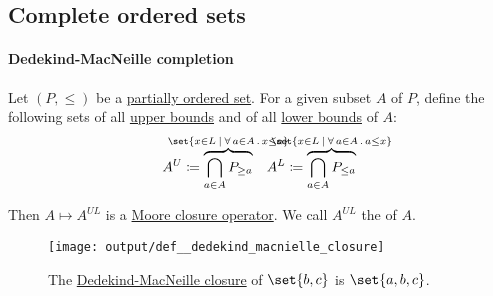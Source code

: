 \subsection{Complete ordered sets}\label{subsec:complete_ordered_set}

\paragraph{Dedekind-MacNeille completion}

\begin{definition}\label{def:dedekind_macnielle_closure}\mimprovised
  Let \( (P, \leq) \) be a \hyperref[def:partially_ordered_set]{partially ordered set}. For a given subset \( A \) of \( P \), define the following sets of all \hyperref[def:extremal_points/upper_and_lower_bounds]{upper bounds} and of all \hyperref[def:extremal_points/upper_and_lower_bounds]{lower bounds} of \( A \):
  \begin{align*}
    A^U \coloneqq \overbrace{\bigcap_{a \in A} P_{\geq a}}^{\mathclap{\set{ x \in L \given \qforall {a \in A} x \leq a }}}
    &&
    A^L \coloneqq \overbrace{\bigcap_{a \in A} P_{\leq a}}^{\mathclap{\set{ x \in L \given \qforall {a \in A} a \leq x }}}
  \end{align*}

  Then \( A \mapsto A^{UL} \) is a \hyperref[def:moore_closure_operator]{Moore closure operator}. We call \( A^{UL} \) the  of \( A \).

  \begin{figure}[!ht]
    \centering
    \texttt{[image: output/def\_\_dedekind\_macnielle\_closure]}
    \caption{The \hyperref[def:dedekind_macnielle_completion]{Dedekind-MacNeille closure} of \( \set{ b, c } \) is \( \set{ a, b, c } \).}\label{fig:def:dedekind_macnielle_closure}
  \end{figure}
\end{definition}
